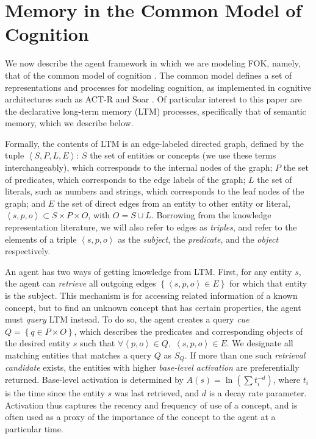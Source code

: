 \documentclass[10pt,letterpaper]{article}
\newcommand{\setof}[1]{\left \{ #1 \right \}}
\newcommand{\tuple}[1]{\left \langle #1 \right \rangle }
\begin{document}
\section{Memory in the Common Model of Cognition}

We now describe the agent framework in which we are modeling FOK, namely, that of the common model of cognition \cite{Laird2017AStandardModel}.
The common model defines a set of representations and processes for modeling cognition, as implemented in cognitive architectures such as ACT-R and Soar \cite{Anderson2007HowCanThe,Laird2012TheSoarCognitive}.
Of particular interest to this paper are the declarative long-term memory (LTM) processes, specifically that of semantic memory, which we describe below.

Formally, the contents of LTM is an edge-labeled directed graph, defined by the tuple $\tuple{S, P, L, E}$:
$S$ the set of entities or concepts (we use these terms interchangeably), which corresponds to the internal nodes of the graph;
$P$ the set of predicates, which corresponds to the edge labels of the graph;
$L$ the set of literals, such as numbers and strings, which corresponds to the leaf nodes of the graph;
and $E$ the set of direct edges from an entity to other entity or literal, $\tuple{s, p, o} \subset S{\times}P{\times}O$, with $O=S{\cup}L$.
Borrowing from the knowledge representation literature, we will also refer to edges as \textit{triples}, and refer to the elements of a triple $\tuple{s, p, o}$ as the \textit{subject}, the \textit{predicate}, and the \textit{object} respectively.

An agent has two ways of getting knowledge from LTM.
First, for any entity $s$, the agent can \textit{retrieve} all outgoing edges $\setof{\tuple{s, p, o}{\in}E}$ for which that entity is the subject.
This mechanism is for accessing related information of a known concept, but to find an unknown concept that has certain properties, the agent must \textit{query} LTM instead.
To do so, the agent creates a query \textit{cue} $Q = \setof{q{\in}P{\times}O}$, which describes the predicates and corresponding objects of the desired entity $s$ such that $\forall \tuple{p, o}{\in}Q, \; \tuple{s, p, o}{\in}E$.
We designate all matching entities that matches a query $Q$ as $S_Q$.
If more than one such \textit{retrieval candidate} exists, the entities with higher \textit{base-level activation} are preferentially returned.
Base-level activation is determined by $A(s) = \ln (\sum {t_i^{-d}})$, where $t_i$ is the time since the entity $s$ was last retrieved, and $d$ is a decay rate parameter.
Activation thus captures the recency and frequency of use of a concept, and is often used as a proxy of the importance of the concept to the agent at a particular time.
\end{document}
